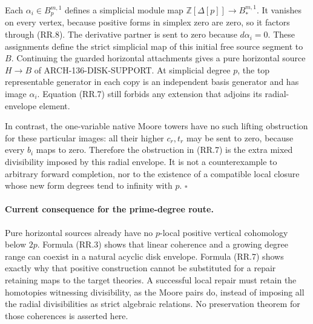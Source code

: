 Each \(\alpha_i\in B_p^{m,1}\) defines a simplicial module map
\(\mathbb Z[\Delta[p]]\to B_*^{m,1}\). It vanishes on every
vertex, because positive forms in simplex zero are zero, so
it factors through (RR.8). The derivative partner is sent to
zero because \(d\alpha_i=0\). These assignments define the
strict simplicial map of this initial free source segment to
\(B\). Continuing the guarded horizontal attachments gives a
pure horizontal source \(H\to B\) of ARCH-136-DISK-SUPPORT.
At simplicial degree \(p\), the top representable generator
in each copy is an independent basis generator and has image
\(\alpha_i\). Equation (RR.7) still forbids any extension that
adjoins its radial-envelope element.

In contrast, the one-variable native Moore towers have no such
lifting obstruction for these particular images: all their
higher \(c_r,t_r\) may be sent to zero, because every \(b_i\)
maps to zero. Therefore the obstruction in (RR.7) is the extra
mixed divisibility imposed by this radial envelope. It is not
a counterexample to arbitrary forward completion, nor to the
existence of a compatible local closure whose new form degrees
tend to infinity with \(p\). \(\square\)

\paragraph{Current consequence for the prime-degree route.}
Pure horizontal sources already have no \(p\)-local positive
vertical cohomology below \(2p\). Formula (RR.3) shows that
linear coherence and a growing degree range can coexist in a
natural acyclic disk envelope. Formula (RR.7) shows exactly why
that positive construction cannot be substituted for a repair
retaining maps to the target theories. A successful local
repair must retain the homotopies witnessing divisibility,
as the Moore pairs do, instead of imposing all the radial
divisibilities as strict algebraic relations. No preservation
theorem for those coherences is asserted here.
